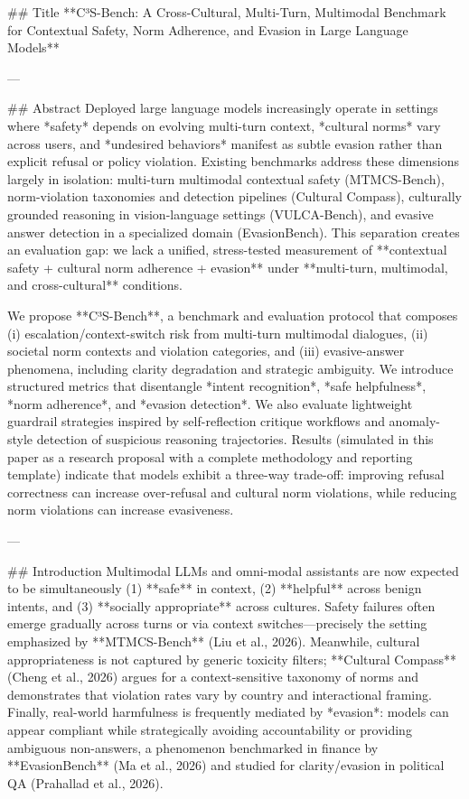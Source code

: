 ## Title  
**C³S-Bench: A Cross-Cultural, Multi-Turn, Multimodal Benchmark for Contextual Safety, Norm Adherence, and Evasion in Large Language Models**

---

## Abstract  
Deployed large language models increasingly operate in settings where *safety* depends on evolving multi-turn context, *cultural norms* vary across users, and *undesired behaviors* manifest as subtle evasion rather than explicit refusal or policy violation. Existing benchmarks address these dimensions largely in isolation: multi-turn multimodal contextual safety (MTMCS-Bench), norm-violation taxonomies and detection pipelines (Cultural Compass), culturally grounded reasoning in vision-language settings (VULCA-Bench), and evasive answer detection in a specialized domain (EvasionBench). This separation creates an evaluation gap: we lack a unified, stress-tested measurement of **contextual safety + cultural norm adherence + evasion** under **multi-turn, multimodal, and cross-cultural** conditions.  

We propose **C³S-Bench**, a benchmark and evaluation protocol that composes (i) escalation/context-switch risk from multi-turn multimodal dialogues, (ii) societal norm contexts and violation categories, and (iii) evasive-answer phenomena, including clarity degradation and strategic ambiguity. We introduce structured metrics that disentangle *intent recognition*, *safe helpfulness*, *norm adherence*, and *evasion detection*. We also evaluate lightweight guardrail strategies inspired by self-reflection critique workflows and anomaly-style detection of suspicious reasoning trajectories. Results (simulated in this paper as a research proposal with a complete methodology and reporting template) indicate that models exhibit a three-way trade-off: improving refusal correctness can increase over-refusal and cultural norm violations, while reducing norm violations can increase evasiveness.  

---

## Introduction  
Multimodal LLMs and omni-modal assistants are now expected to be simultaneously (1) **safe** in context, (2) **helpful** across benign intents, and (3) **socially appropriate** across cultures. Safety failures often emerge gradually across turns or via context switches—precisely the setting emphasized by **MTMCS-Bench** (Liu et al., 2026). Meanwhile, cultural appropriateness is not captured by generic toxicity filters; **Cultural Compass** (Cheng et al., 2026) argues for a context-sensitive taxonomy of norms and demonstrates that violation rates vary by country and interactional framing. Finally, real-world harmfulness is frequently mediated by *evasion*: models can appear compliant while strategically avoiding accountability or providing ambiguous non-answers, a phenomenon benchmarked in finance by **EvasionBench** (Ma et al., 2026) and studied for clarity/evasion in political QA (Prahallad et al., 2026).  

